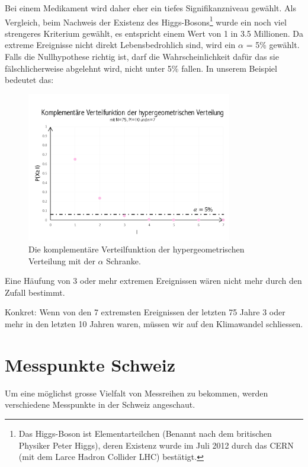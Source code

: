 \begin{refsection}
Bei einem Medikament wird daher eher ein tiefes Signifikanzniveau gewählt. Als Vergleich, beim Nachweis der Existenz des Higgs-Bosons\footnote{%
Das Higgs-Boson ist Elementarteilchen (Benannt nach dem britischen Physiker Peter Higgs), deren Existenz wurde im Juli 2012 durch das CERN (mit dem Larce Hadron Collider LHC) bestätigt.} wurde ein noch viel strengeres Kriterium gewählt, es entspricht einem Wert von 1 in 3.5 Millionen. Da extreme Ereignisse nicht direkt Lebensbedrohlich sind, wird ein $\alpha$ = 5\% gewählt.
Falls die Nullhypothese richtig ist, darf die Wahrscheinlichkeit dafür das sie fälschlicherweise abgelehnt wird, nicht unter 5\% fallen.
In unserem Beispiel bedeutet das:

\begin{figure}[htbp]
\centering
\includegraphics[width=0.8\textwidth]{extrem/Signi.pdf}
\caption{Die komplementäre Verteilfunktion der hypergeometrischen Verteilung mit der $\alpha$ Schranke.}
\label{Signifikanzniveau}
\end{figure}

Eine Häufung von 3 oder mehr extremen Ereignissen wären nicht mehr durch den Zufall bestimmt. 

Konkret: Wenn von den 7 extremsten Ereignissen der letzten 75 Jahre 3 oder mehr in den letzten 10 Jahren waren, müssen wir auf den Klimawandel schliessen.


\section{Messpunkte Schweiz} \label{Beispiele}
Um eine möglichst grosse Vielfalt von Messreihen zu bekommen, werden verschiedene Messpunkte in der Schweiz angeschaut. 


\end{refsection}

